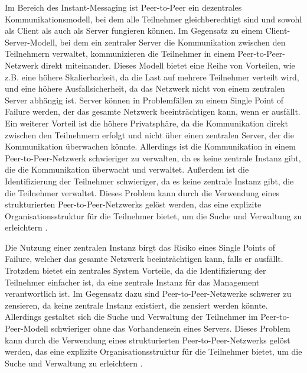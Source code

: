Im Bereich des Instant-Messaging ist Peer-to-Peer ein dezentrales Kommunikationsmodell, bei dem alle Teilnehmer gleichberechtigt sind und sowohl als Client als auch als Server fungieren können. Im Gegensatz zu einem Client-Server-Modell, bei dem ein zentraler Server die Kommunikation zwischen den Teilnehmern verwaltet, kommunizieren die Teilnehmer in einem Peer-to-Peer-Netzwerk direkt miteinander. Dieses Modell bietet eine Reihe von Vorteilen, wie z.B. eine höhere Skalierbarkeit, da die Last auf mehrere Teilnehmer verteilt wird, und eine höhere Ausfallsicherheit, da das Netzwerk nicht von einem zentralen Server abhängig ist. Server können in Problemfällen zu einem Single Point of Failure werden, der das gesamte Netzwerk beeinträchtigen kann, wenn er ausfällt. Ein weiterer Vorteil ist die höhere Privatsphäre, da die Kommunikation direkt zwischen den Teilnehmern erfolgt und nicht über einen zentralen Server, der die Kommunikation überwachen könnte. Allerdings ist die Kommunikation in einem Peer-to-Peer-Netzwerk schwieriger zu verwalten, da es keine zentrale Instanz gibt, die die Kommunikation überwacht und verwaltet. Außerdem ist die Identifizierung der Teilnehmer schwieriger, da es keine zentrale Instanz gibt, die die Teilnehmer verwaltet. Dieses Problem kann durch die Verwendung eines strukturierten Peer-to-Peer-Netzwerks gelöst werden, das eine explizite Organisationsstruktur für die Teilnehmer bietet, um die Suche und Verwaltung zu erleichtern \parencite[S. 6-8]{Mahlmann_P2PNetzwerke}.

Die Nutzung einer zentralen Instanz birgt das Risiko eines Single Points of Failure, welcher das gesamte Netzwerk beeinträchtigen kann, falls er ausfällt. Trotzdem bietet ein zentrales System Vorteile, da die Identifizierung der Teilnehmer einfacher ist, da eine zentrale Instanz für das Management verantwortlich ist. Im Gegensatz dazu sind Peer-to-Peer-Netzwerke schwerer zu zensieren, da keine zentrale Instanz existiert, die zensiert werden könnte. Allerdings gestaltet sich die Suche und Verwaltung der Teilnehmer im Peer-to-Peer-Modell schwieriger ohne das Vorhandensein eines Servers. Dieses Problem kann durch die Verwendung eines strukturierten Peer-to-Peer-Netzwerks gelöst werden, das eine explizite Organisationsstruktur für die Teilnehmer bietet, um die Suche und Verwaltung zu erleichtern \parencite{Luntovskyy_ModRechnernetze}.

